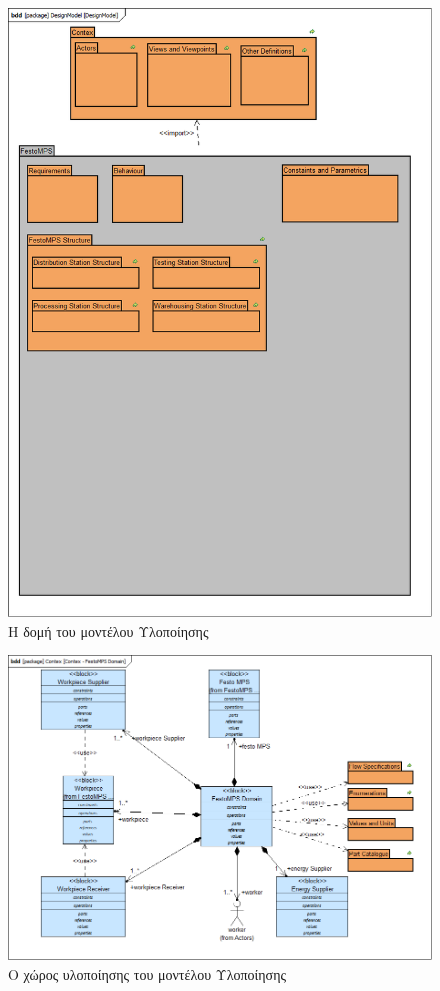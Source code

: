 \documentclass[a4paper,12pt,twoside]{report}
\begin{document}
{\begin{appendices}
				\clearpage
				\begin{figure}[hp]
					\centering
					\includegraphics[scale=0.45]{DesignModel_DesignModel.png}
					\caption{Η δομή του μοντέλου Υλοποίησης}
					\label{φωτ:Η δομή του μοντέλου Υλοποίησης}
				\end{figure}
				
				\begin{figure}[hp]
					\centering
					\includegraphics[scale=0.45]{DesignModel_Contex-FestoMPSDomain.png}
					\caption{Ο χώρος υλοποίησης του μοντέλου Υλοποίησης}
					\label{φωτ:Ο χώρος υλοποίησης του μοντέλου Υλοποίησης}
				\end{figure}
				

\end{appendices}}
\end{document}
